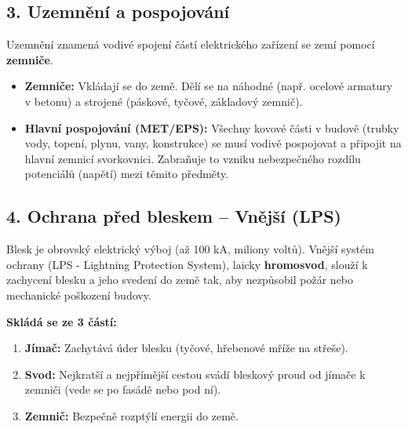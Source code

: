 \documentclass[a4paper,10pt]{article}
\begin{document}
\begin{vysvetlenibox}
\begin{center}
\end{center}

\subsection*{3. Uzemnění a pospojování}

Uzemnění znamená vodivé spojení částí elektrického zařízení se zemí pomocí \textbf{zemniče}.

\begin{itemize}
    \item \textbf{Zemniče:} Vkládají se do země. Dělí se na náhodné (např. ocelové armatury v betonu) a strojené (páskové, tyčové, základový zemnič).
    \item \textbf{Hlavní pospojování (MET/EPS):} Všechny kovové části v budově (trubky vody, topení, plynu, vany, konstrukce) se musí vodivě pospojovat a připojit na hlavní zemnicí svorkovnici. Zabraňuje to vzniku nebezpečného rozdílu potenciálů (napětí) mezi těmito předměty.
\end{itemize}

\subsection*{4. Ochrana před bleskem – Vnější (LPS)}

Blesk je obrovský elektrický výboj (až 100 kA, miliony voltů). Vnější systém ochrany (LPS - Lightning Protection System), laicky \textbf{hromosvod}, slouží k zachycení blesku a jeho svedení do země tak, aby nezpůsobil požár nebo mechanické poškození budovy.

\textbf{Skládá se ze 3 částí:}
\begin{enumerate}
    \item \textbf{Jímač:} Zachytává úder blesku (tyčové, hřebenové mříže na střeše).
    \item \textbf{Svod:} Nejkratší a nejpřímější cestou svádí bleskový proud od jímače k zemniči (vede se po fasádě nebo pod ní).
    \item \textbf{Zemnič:} Bezpečně rozptýlí energii do země.
\end{enumerate}


\end{vysvetlenibox}
\end{document}
